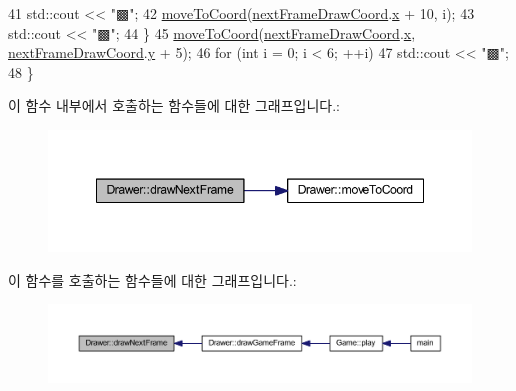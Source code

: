 \begin{DoxyCode}
41             std::cout << \textcolor{stringliteral}{"▩"};
42             \mbox{\hyperlink{class_drawer_ac1a96e007c07cab2e36a7c78484ee9a6}{moveToCoord}}(\mbox{\hyperlink{tetris__drawer_8h_a83cc61593b9fb64d690139400b3d760b}{nextFrameDrawCoord}}.\mbox{\hyperlink{struct_coord_a696eaa744360fc791d0e3b331c549dbe}{x}} + 10, i);
43             std::cout << \textcolor{stringliteral}{"▩"};
44         \}
45         \mbox{\hyperlink{class_drawer_ac1a96e007c07cab2e36a7c78484ee9a6}{moveToCoord}}(\mbox{\hyperlink{tetris__drawer_8h_a83cc61593b9fb64d690139400b3d760b}{nextFrameDrawCoord}}.\mbox{\hyperlink{struct_coord_a696eaa744360fc791d0e3b331c549dbe}{x}}, 
      \mbox{\hyperlink{tetris__drawer_8h_a83cc61593b9fb64d690139400b3d760b}{nextFrameDrawCoord}}.\mbox{\hyperlink{struct_coord_a214166cca70cef7dda9201689c3e81ab}{y}} + 5);
46         \textcolor{keywordflow}{for} (\textcolor{keywordtype}{int} i = 0; i < 6; ++i)
47             std::cout << \textcolor{stringliteral}{"▩"};
48     \}
\end{DoxyCode}
이 함수 내부에서 호출하는 함수들에 대한 그래프입니다.\+:
\nopagebreak
\begin{figure}[H]
\begin{center}
\leavevmode
\includegraphics[width=348pt]{class_drawer_a2deae79fb268b41b72693d005cdf2178_cgraph}
\end{center}
\end{figure}
이 함수를 호출하는 함수들에 대한 그래프입니다.\+:
\nopagebreak
\begin{figure}[H]
\begin{center}
\leavevmode
\includegraphics[width=350pt]{class_drawer_a2deae79fb268b41b72693d005cdf2178_icgraph}
\end{center}
\end{figure}
\mbox{\label{class_drawer_ad87ca95db3cafee6f005e297e2c6d4de}} 
